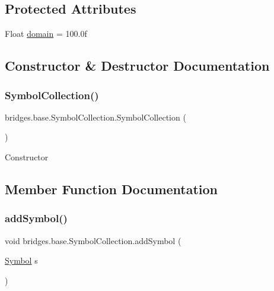 \subsection*{Protected Attributes}
\begin{DoxyCompactItemize}
\item 
Float \mbox{\hyperlink{classbridges_1_1base_1_1_symbol_collection_a7624e96d2a4b5b6264791eb8dacbd350}{domain}} = 100.\+0f
\end{DoxyCompactItemize}


\subsection{Constructor \& Destructor Documentation}
\mbox{\label{classbridges_1_1base_1_1_symbol_collection_a8959dab963ce54f56560c6c27a3a3de5}} 
\subsubsection{\texorpdfstring{SymbolCollection()}{SymbolCollection()}}
{\footnotesize\ttfamily bridges.\+base.\+Symbol\+Collection.\+Symbol\+Collection (\begin{DoxyParamCaption}{ }\end{DoxyParamCaption})}

Constructor 

\subsection{Member Function Documentation}
\mbox{\label{classbridges_1_1base_1_1_symbol_collection_a8e934c53b78b05a7e982f3ff2362adea}} 
\subsubsection{\texorpdfstring{addSymbol()}{addSymbol()}}
{\footnotesize\ttfamily void bridges.\+base.\+Symbol\+Collection.\+add\+Symbol (\begin{DoxyParamCaption}\item[{\mbox{\hyperlink{classbridges_1_1base_1_1_symbol}{Symbol}}}]{s }\end{DoxyParamCaption})}

